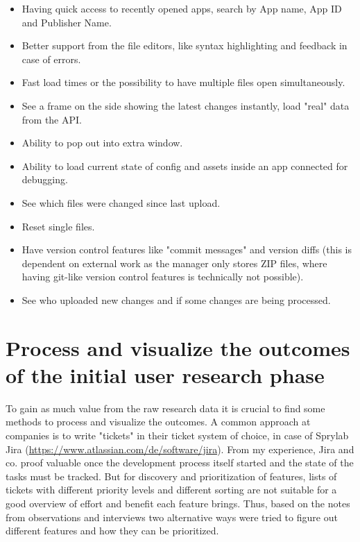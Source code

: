 \begin{description}[nosep]
  \item[App Selection] \leavevmode
  \begin{itemize}
    \item Having quick access to recently opened apps, search by App name, App ID and Publisher Name.
  \end{itemize}
  \item[App Editing] \leavevmode
  \begin{itemize}
    \item Better support from the file editors, like syntax highlighting and feedback in case of errors.
    \item Fast load times or the possibility to have multiple files open simultaneously.
  \end{itemize}
  \item[App Preview]\leavevmode
   \begin{itemize}
    \item See a frame on the side showing the latest changes instantly, load "real" data from the API.
    \item Ability to pop out into extra window.
    \item Ability to load current state of config and assets inside an app connected for debugging.
  \end{itemize}
  \item[Dynamic Resource Change Management] \leavevmode
  \begin{itemize}
    \item See which files were changed since last upload.
    \item Reset single files.
    \item Have version control features like "commit messages" and version diffs (this is dependent on external work as the \Gls{manager} only stores ZIP files, where having git-like version control features is technically not possible).
    \item See who uploaded new changes and if some changes are being processed.
  \end{itemize}
\end{description}


\section{Process and visualize the outcomes of the initial user research phase}

To gain as much value from the raw research data it is crucial to find some methods to process and visualize the outcomes.
A common approach at companies is to write "tickets" in their ticket system of choice, in case of Sprylab Jira (\url{https://www.atlassian.com/de/software/jira}).
From my experience, Jira and co. proof valuable once the development process itself started and the state of the tasks must be tracked.
But for discovery and prioritization of features, lists of tickets with different priority levels and different sorting are not suitable for a good overview of effort and benefit each feature brings.
Thus, based on the notes from observations and interviews two alternative ways were tried to figure out different features and how they can be prioritized.

